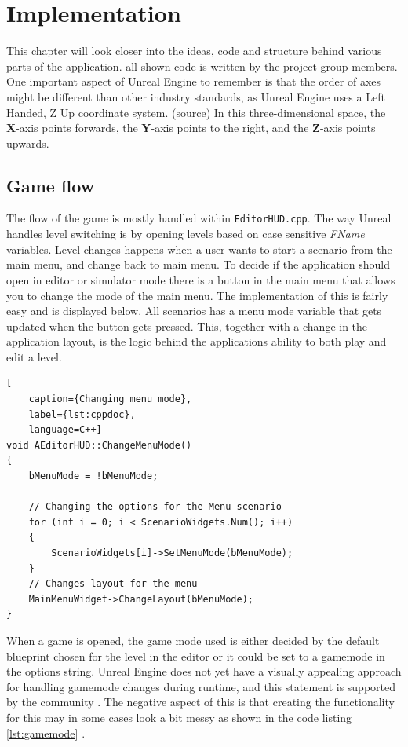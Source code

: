 \chapter{Implementation} \label{implementation_chapter}
This chapter will look closer into the ideas, code and structure behind various parts of the application. all shown code is written by the project group members. One important aspect of Unreal Engine to remember is that the order of axes might be different than other industry standards, as Unreal Engine uses a Left Handed, Z Up coordinate system. (source) In this three-dimensional space, the \textbf{X}-axis points forwards, the \textbf{Y}-axis points to the right, and the \textbf{Z}-axis points upwards.


\section{Game flow} \label{game_flow}

The flow of the game is mostly handled within \verb|EditorHUD.cpp|. The way Unreal handles level switching is by opening levels based on case sensitive \textit{FName} variables. Level changes happens when a user wants to start a scenario from the main menu, and change back to main menu. To decide if the application should open in editor or simulator mode there is a button in the main menu that allows you to change the mode of the main menu. The implementation of this is fairly easy and is displayed below. All scenarios has a menu mode variable that gets updated when the button gets pressed. This, together with a change in the application layout, is the logic behind the applications ability to both play and edit a level.

\begin{lstlisting}[
    caption={Changing menu mode},
    label={lst:cppdoc},
    language=C++]
void AEditorHUD::ChangeMenuMode()
{
	bMenuMode = !bMenuMode;

	// Changing the options for the Menu scenario
	for (int i = 0; i < ScenarioWidgets.Num(); i++)
	{
		ScenarioWidgets[i]->SetMenuMode(bMenuMode);
	}
	// Changes layout for the menu
	MainMenuWidget->ChangeLayout(bMenuMode);
}
\end{lstlisting}

When a game is opened, the game mode used is either decided by the default blueprint chosen for the level in the editor or it could be set to a gamemode in the options string. Unreal Engine does not yet have a visually appealing approach for handling gamemode changes during runtime, and this statement is supported by the community \cite{ue4_change_gamemode}. The negative aspect of this is that creating the functionality for this may in some cases look a bit messy as shown in the code listing \ref{lst:gamemode} .

